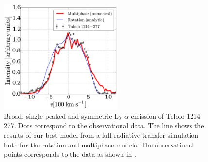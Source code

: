 \documentclass[a4,useAMS,usenatbib,usegraphicx]{mn2e}
\newcommand{\tol}{Tololo 1214-277}
\begin{document}
\begin{figure}
\begin{center}
\includegraphics[width=0.55\textwidth]{CLARA-TOL-main.pdf}
\caption{Broad, single peaked and symmetric Ly-$\alpha$ emission of \tol.
  Dots correspond to the observational data. The line shows the results
of our best model from a full radiative transfer simulation both for
the rotation and multiphase models.
The observational points corresponds to the data as shown in
\citep{mashesse03}.}   
\end{center}
\end{figure}
\end{document}
